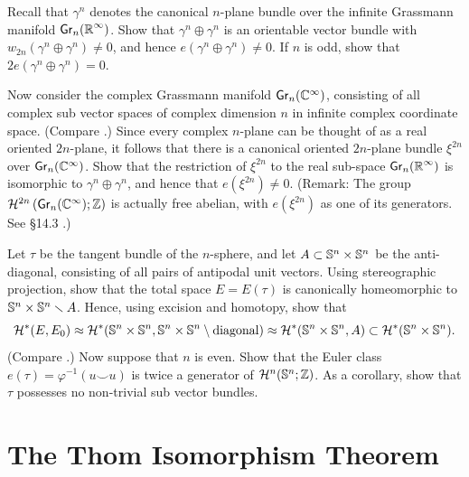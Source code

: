 \begin{problem}\label{prob-9-A}
	Recall that $\gamma^{ n }$ denotes the canonical $n$-plane bundle over the infinite Grassmann manifold $\grass{n}{}(\R^{\infty})$. Show that $\gamma^{n} \oplus \gamma^{n}$ is an orientable vector bundle with $w_{2 n}(\gamma^{n} \oplus \gamma^{n}) \neq 0$, and hence $e(\gamma^{n} \oplus \gamma^{n}) \neq 0$. If $ n $ is odd, show that $2 e(\gamma^{ n } \oplus \gamma^{ n })=0$.
\end{problem}
\begin{problem}\label{prob-9-B}
	Now consider the complex Grassmann manifold $\grass{n}{}(\Cx^{\infty})$, consisting of all complex sub vector spaces of complex dimension $ n $ in infinite complex coordinate space. (Compare .) Since every complex $ n $-plane can be thought of as a real oriented $2n$-plane, it follows that there is a canonical oriented $2 n$-plane bundle $\xi^{2 n}$ over $\grass{ n }{}(\Cx^{\infty})$. Show that the restriction of $\xi^{2 n}$ to the real sub-space $\grass{ n }{}(\R^\infty)$ is isomorphic to $\gamma^{ n } \oplus \gamma^{ n }$, and hence that $e(\xi^{2  n }) \neq 0$. (Remark: The group $\homology^{2  n }\left(\grass{ n }{}(\Cx^{\infty}) ; \Z\right)$ is actually free abelian, with $e(\xi^{2  n })$ as one of its generators. See \S 14.3 .)
\end{problem}
\begin{problem}\label{prob-9-C}
	Let $\tau$ be the tangent bundle of the $ n$-sphere, and let  $A\subset  \mathbb{S}^{n} \times \mathbb{S}^{n}$ be the anti-diagonal, consisting of all pairs of antipodal unit vectors. Using stereographic projection, show that the total space $E= E(\tau)$ is canonically homeomorphic to $\mathbb{S}^{n} \times \mathbb{S}^{n}\smallsetminus A$. Hence, using excision and homotopy, show that \[\mathcal{H}^{*}(E, E_{0}) \approx \mathcal{H}^{*}(\mathbb{S}^{n} \times \mathbb{S}^{n}, \mathbb{S}^{n} \times \mathbb{S}^{n}\setminus\text{diagonal}) \approx \mathcal{H}^{*}(\mathbb{S}^{n} \times \mathbb{S}^{n}, A) \subset \mathcal{H}^{*}(\mathbb{S}^{n} \times \mathbb{S}^{n}).\]
	(Compare .) Now suppose that $ n $ is even. Show that the Euler class $e(\tau)=\varphi^{-1}(u \smile u)$ is twice a generator of $\mathcal{H}^{ n }(\mathbb{S}^{ n } ; \mathbb{Z})$. As a corollary, show that $\tau$ possesses no non-trivial sub vector bundles. 
\end{problem}

\chapter{The Thom Isomorphism Theorem}\label{ch-10}

